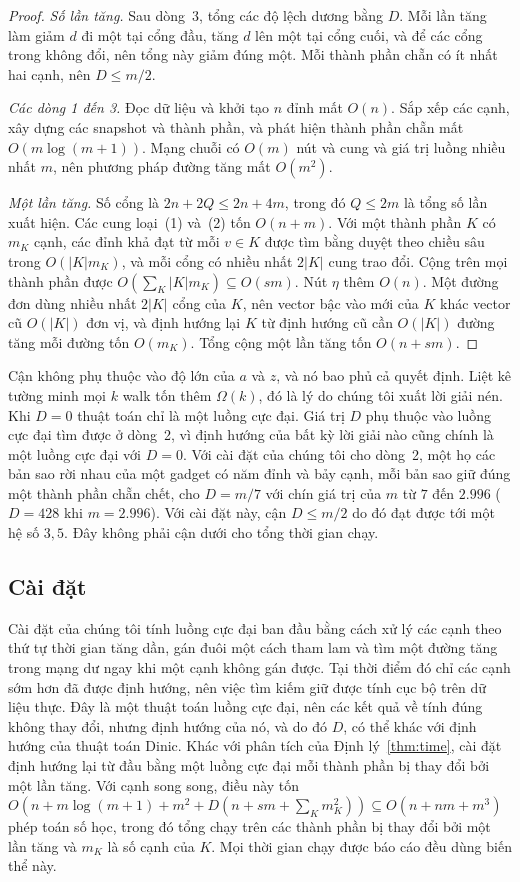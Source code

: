 \documentclass[pdflatex,sn-mathphys-num]{sn-jnl}
\theoremstyle{thmstyleone}%
\theoremstyle{thmstyletwo}%
\theoremstyle{thmstylethree}%
\newcommand{\abs}[1]{\lvert #1\rvert}
\begin{document}
\begin{proof}
\emph{Số lần tăng.} Sau dòng~3, tổng các độ lệch dương bằng $D$. Mỗi lần tăng làm giảm $d$ đi một tại cổng đầu, tăng $d$ lên một tại cổng cuối, và để các cổng trong không đổi, nên tổng này giảm đúng một. Mỗi thành phần chẵn có ít nhất hai cạnh, nên $D\le m/2$.

\emph{Các dòng 1 đến 3.} Đọc dữ liệu và khởi tạo $n$ đỉnh mất $O(n)$. Sắp xếp các cạnh, xây dựng các snapshot và thành phần, và phát hiện thành phần chẵn mất $O(m\log(m+1))$. Mạng chuỗi có $O(m)$ nút và cung và giá trị luồng nhiều nhất $m$, nên phương pháp đường tăng mất $O(m^2)$.

\emph{Một lần tăng.} Số cổng là $2n+2Q\le2n+4m$, trong đó $Q\le2m$ là tổng số lần xuất hiện. Các cung loại~(1) và~(2) tốn $O(n+m)$. Với một thành phần $K$ có $m_K$ cạnh, các đỉnh khả đạt từ mỗi $v\in K$ được tìm bằng duyệt theo chiều sâu trong $O(\abs{K}m_K)$, và mỗi cổng có nhiều nhất $2\abs{K}$ cung trao đổi. Cộng trên mọi thành phần được $O(\sum_K\abs{K}m_K)\subseteq O(sm)$. Nút $\eta$ thêm $O(n)$. Một đường đơn dùng nhiều nhất $2\abs{K}$ cổng của $K$, nên vector bậc vào mới của $K$ khác vector cũ $O(\abs{K})$ đơn vị, và định hướng lại $K$ từ định hướng cũ cần $O(\abs{K})$ đường tăng mỗi đường tốn $O(m_K)$. Tổng cộng một lần tăng tốn $O(n+sm)$.
\end{proof}

Cận không phụ thuộc vào độ lớn của $a$ và $z$, và nó bao phủ cả quyết định. Liệt kê tường minh mọi $k$ walk tốn thêm $\Omega(k)$, đó là lý do chúng tôi xuất lời giải nén. Khi $D=0$ thuật toán chỉ là một luồng cực đại. Giá trị $D$ phụ thuộc vào luồng cực đại tìm được ở dòng~2, vì định hướng của bất kỳ lời giải nào cũng chính là một luồng cực đại với $D=0$. Với cài đặt của chúng tôi cho dòng~2, một họ các bản sao rời nhau của một gadget có năm đỉnh và bảy cạnh, mỗi bản sao giữ đúng một thành phần chẵn chết, cho $D=m/7$ với chín giá trị của $m$ từ $7$ đến $2.996$ ($D=428$ khi $m=2.996$). Với cài đặt này, cận $D\le m/2$ do đó đạt được tới một hệ số $3{,}5$. Đây không phải cận dưới cho tổng thời gian chạy.


\subsection{Cài đặt}\label{sec:impl}

Cài đặt của chúng tôi tính luồng cực đại ban đầu bằng cách xử lý các cạnh theo thứ tự thời gian tăng dần, gán đuôi một cách tham lam và tìm một đường tăng trong mạng dư ngay khi một cạnh không gán được. Tại thời điểm đó chỉ các cạnh sớm hơn đã được định hướng, nên việc tìm kiếm giữ được tính cục bộ trên dữ liệu thực. Đây là một thuật toán luồng cực đại, nên các kết quả về tính đúng không thay đổi, nhưng định hướng của nó, và do đó $D$, có thể khác với định hướng của thuật toán Dinic. Khác với phân tích của Định lý~\ref{thm:time}, cài đặt định hướng lại từ đầu bằng một luồng cực đại mỗi thành phần bị thay đổi bởi một lần tăng. Với cạnh song song, điều này tốn $O(n+m\log(m+1)+m^2+D(n+sm+\sum_Km_K^2))\subseteq O(n+nm+m^3)$ phép toán số học, trong đó tổng chạy trên các thành phần bị thay đổi bởi một lần tăng và $m_K$ là số cạnh của $K$. Mọi thời gian chạy được báo cáo đều dùng biến thể này.
\end{document}
